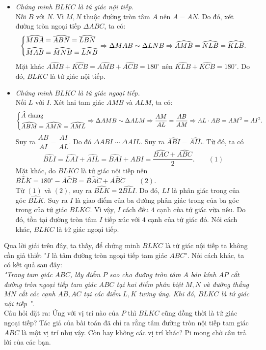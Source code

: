 \begin{bt}
{{		}
		\begin{itemize}
			\item \textit{Chứng minh $BLKC$ là tứ giác nội tiếp.}\\
			Nối $B$ với $N$. Vì $M, N$ thuộc đường tròn tâm $A$ nên $A=AN$. Do đó, xét đường tròn ngoại tiếp $\Delta ABC$, ta có:
			$$\left\{\begin{aligned}& \widehat{MBA}=\widehat{ABN}=\widehat{LBN}\\ & \widehat{MAB}=\widehat{MNB}=\widehat{LNB}\end{aligned}\right.\Rightarrow \Delta MAB \sim \Delta LNB \Rightarrow \widehat{AMB} = \widehat{NLB} =\widehat{KLB}.$$
			Mặt khác $\widehat{AMB}+\widehat{KCB}=\widehat{AMB}+\widehat{ACB}=180^{\circ}$ nên $\widehat{KLB}+\widehat{KCB}=180^{\circ}$. Do đó, $BLKC$ là tứ giác nội tiếp.
			\item \textit{Chứng minh $BLKC$ là tứ giác ngoại tiếp.}\\
			Nối $L$ với $I$. Xét hai tam giác $AMB$ và $ALM $, ta có:
			$$\left\{\begin{aligned}& \widehat{A} \text{ chung}\\ & \widehat{ABM} =\widehat{AMN}=\widehat{AML}\end{aligned}\right. \Rightarrow \Delta AMB \sim \Delta ALM  \Rightarrow \dfrac{AM}{AL} = \dfrac{AB}{AM}\Rightarrow AL \cdot AB =AM^2 = AI^2.$$
			Suy ra $\dfrac{AB}{AI} =\dfrac{AI}{AL}$. Do đó $\Delta ABI \sim \Delta AIL $. Suy ra $\widehat{ABI}=\widehat{AIL}$. Từ đó, ta có
			$$\widehat{BLI}= \widehat{LAI}+\widehat{AIL} =\widehat{BAI}+\widehat{ABI}=\dfrac{\widehat{BAC}+\widehat{ABC}}{2}. \qquad (1)$$
			Mặt khác, do $BLKC$ là tứ giác nội tiếp nên $\widehat{BLK}=180^{\circ} -\widehat{ACB}=\widehat{BAC}+\widehat{ABC}\qquad (2)$.\\
			Từ $(1)$ và $(2)$, suy ra $\widehat{BLK} =2\widehat{BLI}$. Do đó, $LI$ là phân giác trong của góc $\widehat{BLK}$. Suy ra $I$ là giao điểm của ba đường phân giác trong của ba góc trong của tứ giác $BLKC$. Vì vậy, $I$ cách đều $4$ cạnh của tứ giác vừa nêu. Do đó, tồn tại đường tròn tâm $I$ tiếp xúc với $4$ cạnh của tứ giác đó. Nói cách khác, $BLKC$ là tứ giác ngoại tiếp.		
	\end{itemize}
\begin{nx}
	Qua lời giải trên đây, ta thấy, để chứng minh $BLKC$ là tứ giác nội tiếp ta không cần giả thiết "$I$ là tâm đường tròn ngoại tiếp tam giác $ABC$". Nói cách khác, ta có kết quả sau đây:\\
	\textit{"Trong tam giác $ABC$, lấy điểm $P$ sao cho đường tròn tâm $A$ bán kính $AP$ cắt đường tròn ngoại tiếp tam giác $ABC$ tại hai điểm phân biệt $M,N$ và đường thẳng $MN$ cắt các cạnh $AB, AC$ tại các điểm $L,K$ tương ứng. Khi đó, $BLKC$ là tứ giác nội tiếp ".}\\
	Câu hỏi đặt ra: Ứng với vị trí nào của $P$ thì $BLKC$ cũng đồng thời là tứ giác ngoại tiếp? Tác giả của bài toán đã chỉ ra rằng tâm đường tròn nội tiếp tam giác $ABC$ là một vị trí như vậy. Còn hay không các vị trí khác? Pi mong chờ câu trả lời của các bạn.	
\end{nx}}
\end{bt}
